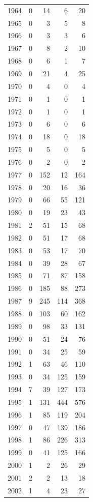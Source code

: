 \documentclass[
  english,
]{article}
\begin{document}
\begin{longtable}{rrrrr}
1964 & 0 & 14 & 6 & 20 \\ 
1965 & 0 & 3 & 5 & 8 \\ 
1966 & 0 & 3 & 3 & 6 \\ 
1967 & 0 & 8 & 2 & 10 \\ 
1968 & 0 & 6 & 1 & 7 \\ 
1969 & 0 & 21 & 4 & 25 \\ 
1970 & 0 & 4 & 0 & 4 \\ 
1971 & 0 & 1 & 0 & 1 \\ 
1972 & 0 & 1 & 0 & 1 \\ 
1973 & 0 & 6 & 0 & 6 \\ 
1974 & 0 & 18 & 0 & 18 \\ 
1975 & 0 & 5 & 0 & 5 \\ 
1976 & 0 & 2 & 0 & 2 \\ 
1977 & 0 & 152 & 12 & 164 \\ 
1978 & 0 & 20 & 16 & 36 \\ 
1979 & 0 & 66 & 55 & 121 \\ 
1980 & 0 & 19 & 23 & 43 \\ 
1981 & 2 & 51 & 15 & 68 \\ 
1982 & 0 & 51 & 17 & 68 \\ 
1983 & 0 & 53 & 17 & 70 \\ 
1984 & 0 & 39 & 28 & 67 \\ 
1985 & 0 & 71 & 87 & 158 \\ 
1986 & 0 & 185 & 88 & 273 \\ 
1987 & 9 & 245 & 114 & 368 \\ 
1988 & 0 & 103 & 60 & 162 \\ 
1989 & 0 & 98 & 33 & 131 \\ 
1990 & 0 & 51 & 24 & 76 \\ 
1991 & 0 & 34 & 25 & 59 \\ 
1992 & 1 & 63 & 46 & 110 \\ 
1993 & 0 & 34 & 125 & 159 \\ 
1994 & 7 & 39 & 127 & 173 \\ 
1995 & 1 & 131 & 444 & 576 \\ 
1996 & 1 & 85 & 119 & 204 \\ 
1997 & 0 & 47 & 139 & 186 \\ 
1998 & 1 & 86 & 226 & 313 \\ 
1999 & 0 & 41 & 125 & 166 \\ 
2000 & 1 & 2 & 26 & 29 \\ 
2001 & 2 & 2 & 13 & 18 \\ 
2002 & 1 & 4 & 23 & 27 \\ 

\end{longtable}
\end{document}
